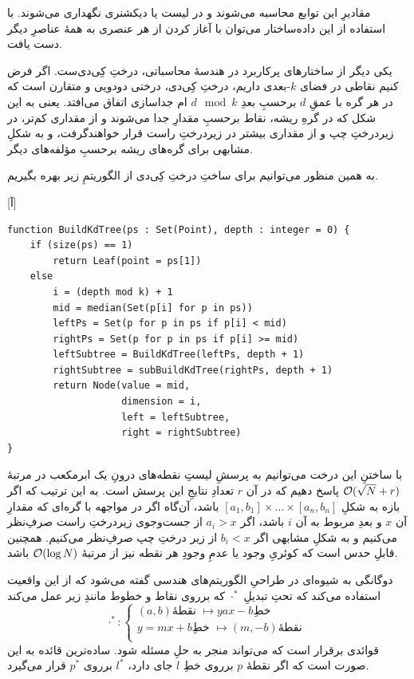 مقادیرِ این توابع محاسبه می‌شوند و در لیست یا دیکشنری نگهداری می‌شوند. با استفاده از این داده‌ساختار می‌توان با آغاز کردن از هر عنصری به همهٔ عناصرِ دیگر دست یافت. 

یکی دیگر از ساختارهای پرکاربرد در هندسهٔ محاسباتی، درختِ کِی‌دی‌ست. اگر فرض کنیم نقاطی در فضای $k$-بعدی داریم، درختِ کِی‌دی، درختی دودویی و متقارن است که در هر گره با عمقِ $d$ برحسبِ بعدِ 
$d \mod k$
ام جداسازی اتفاق می‌افتد. یعنی به این شکل که در گرهِ ریشه، نقاط برحسبِ مقدارِ  جدا می‌شوند و از مقداری کم‌تر، در زیردرختِ چپ و از مقداری بیشتر در زیردرختِ راست قرار خواهندگرفت، و به شکلِ مشابهی برای گره‌های ریشه برحسبِ مؤلفه‌های دیگر.

به همین منظور می‌توانیم برای ساختِ درختِ کِی‌دی از الگوریتمِ زیر بهره بگیریم.

[آ]
\begin{latin}
\begin{lstlisting}
function BuildKdTree(ps : Set(Point), depth : integer = 0) {
    if (size(ps) == 1)
        return Leaf(point = ps[1])
    else
        i = (depth mod k) + 1 
        mid = median(Set(p[i] for p in ps))
        leftPs = Set(p for p in ps if p[i] < mid)
        rightPs = Set(p for p in ps if p[i] >= mid)
        leftSubtree = BuildKdTree(leftPs, depth + 1)
        rightSubtree = subBuildKdTree(rightPs, depth + 1)
        return Node(value = mid,
                    dimension = i, 
                    left = leftSubtree, 
                    right = rightSubtree)
}
\end{lstlisting}
\end{latin}


با ساختنِ این درخت می‌توانیم به پرسشِ لیستِ نقطه‌های درونِ یک ابرمکعب در مرتبهٔ 
$\mathcal{O}(\sqrt{N} + r)$
پاسخ دهیم که در آن $r$ تعدادِ نتایجِ این پرسش است. به این ترتیب که اگر بازه به شکلِ 
\( [a_1, b_1] \times\dots\times [a_n, b_n] \)
باشد، آن‌گاه اگر در مواجهه با گره‌ای که مقدارِ آن $x$ و بعدِ مربوط به آن $i$ باشد، اگر 
$a_i > x$
از جست‌وجوی زیردرختِ راست صرفِ‌نظر می‌کنیم و به شکلِ مشابهی اگر
$b_i < x$
از زیر درختِ چپ صرفِ‌نظر می‌کنیم.
  همچنین قابلِ حدس است که کوئریِ وجود یا عدمِ وجودِ هر نقطه نیز از مرتبهٔ
$\mathcal{O}(\log N)$
باشد.


دوگانگی به شیوه‌ای در طراحیِ الگوریتم‌های هندسی گفته می‌شود که از این واقعیت استفاده می‌کند که تحتِ تبدیلِ $\cdot^*$ که برروی نقاط و خطوط مانندِ زیر عمل می‌کند
\begin{equation}
    \cdot^* : \begin{cases}
        (a, b) \text{نقطهٔ } \mapsto y ax - b \text{خطِ } \\
        y = mx + b \text{خطِ } \mapsto (m, -b) \text{نقطهٔ } \\ 
    \end{cases}
\end{equation}
قوائدی برقرار است که می‌تواند منجر به حلِ مسئله شود. ساده‌ترین قائده به این صورت است که اگر نقطهٔ $p$ برروی خطِ $l$ جای دارد، $l^*$ برروی $p^*$ قرار می‌گیرد.

